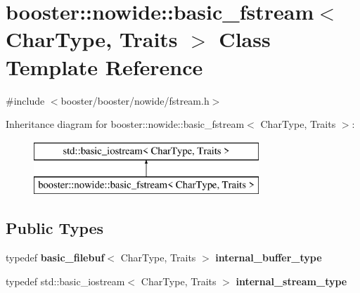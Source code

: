 \section{booster\+:\+:nowide\+:\+:basic\+\_\+fstream$<$ Char\+Type, Traits $>$ Class Template Reference}
\label{classbooster_1_1nowide_1_1basic__fstream}


{\ttfamily \#include $<$booster/booster/nowide/fstream.\+h$>$}

Inheritance diagram for booster\+:\+:nowide\+:\+:basic\+\_\+fstream$<$ Char\+Type, Traits $>$\+:\begin{figure}[H]
\begin{center}
\leavevmode
\includegraphics[height=2.000000cm]{classbooster_1_1nowide_1_1basic__fstream}
\end{center}
\end{figure}
\subsection*{Public Types}
\begin{DoxyCompactItemize}
\item 
typedef {\bf basic\+\_\+filebuf}$<$ Char\+Type, Traits $>$ {\bfseries internal\+\_\+buffer\+\_\+type}\label{classbooster_1_1nowide_1_1basic__fstream_a34fd09bc911e53133f4d38e251d6c6e7}

\item 
typedef std\+::basic\+\_\+iostream$<$ Char\+Type, Traits $>$ {\bfseries internal\+\_\+stream\+\_\+type}\label{classbooster_1_1nowide_1_1basic__fstream_a7644af06e695c66947a515214ae17820}

\end{DoxyCompactItemize}
